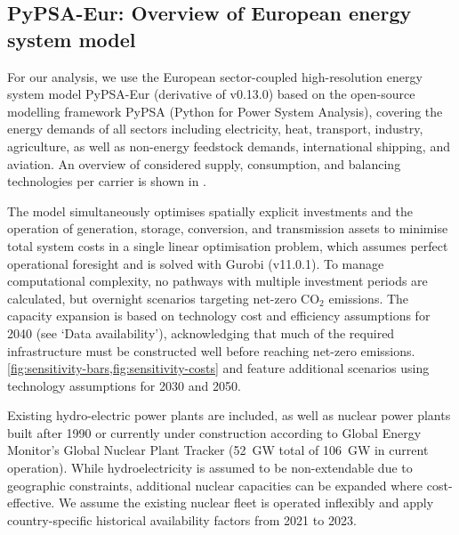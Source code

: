 

\subsection*{PyPSA-Eur: Overview of European energy system model}
\label{sec:methods-overview}

For our analysis, we use the European sector-coupled high-resolution energy
system model PyPSA-Eur\cite{horschPyPSAEurOpen2018a} (derivative of v0.13.0) based on the open-source
modelling framework PyPSA\cite{brownPyPSAPython2018} (Python for Power System
Analysis), covering the energy demands of all sectors including electricity,
heat, transport, industry, agriculture, as well as non-energy feedstock demands,
international shipping, and aviation. An overview of considered supply,
consumption, and balancing technologies per carrier is shown in
.

The model simultaneously optimises spatially explicit investments and the
operation of generation, storage, conversion, and transmission assets to
minimise total system costs in a single linear optimisation problem, which
assumes perfect operational foresight and is solved with Gurobi
(v11.0.1).\cite{gurobi} To manage computational complexity, no pathways with multiple
investment periods are calculated, but overnight scenarios targeting net-zero
CO$_2$ emissions. The capacity expansion is based on technology cost and
efficiency assumptions for 2040 (see `Data availability'), acknowledging that
much of the required infrastructure must be constructed well before reaching
net-zero emissions. \cref{fig:sensitivity-bars,fig:sensitivity-costs} and
 feature additional scenarios using technology
assumptions for 2030 and 2050.

Existing hydro-electric power plants\cite{gotzensPerformingEnergy2019} are
included, as well as nuclear power plants built after 1990 or currently under
construction according to Global Energy Monitor's Global Nuclear Plant Tracker
(52~GW total of 106~GW in current
operation).\cite{globalenergymonitorGlobalNuclearPower2024} While
hydroelectricity is assumed to be non-extendable due to geographic constraints,
additional nuclear capacities can be expanded where cost-effective. We assume
the existing nuclear fleet is operated inflexibly and apply country-specific
historical availability factors from 2021 to
2023.\cite{internationalatomicenergyagencyPowerReactorInformation2024}


